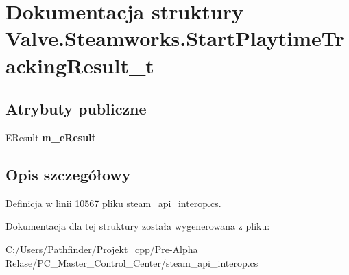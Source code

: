 \hypertarget{struct_valve_1_1_steamworks_1_1_start_playtime_tracking_result__t}{}\section{Dokumentacja struktury Valve.\+Steamworks.\+Start\+Playtime\+Tracking\+Result\+\_\+t}
\label{struct_valve_1_1_steamworks_1_1_start_playtime_tracking_result__t}
\subsection*{Atrybuty publiczne}
\begin{DoxyCompactItemize}
\item 
\mbox{\label{struct_valve_1_1_steamworks_1_1_start_playtime_tracking_result__t_a29d0b34b3eabd37302700a7db54c4584}} 
E\+Result {\bfseries m\+\_\+e\+Result}
\end{DoxyCompactItemize}


\subsection{Opis szczegółowy}


Definicja w linii 10567 pliku steam\+\_\+api\+\_\+interop.\+cs.



Dokumentacja dla tej struktury została wygenerowana z pliku\+:\begin{DoxyCompactItemize}
\item 
C\+:/\+Users/\+Pathfinder/\+Projekt\+\_\+cpp/\+Pre-\/\+Alpha Relase/\+P\+C\+\_\+\+Master\+\_\+\+Control\+\_\+\+Center/steam\+\_\+api\+\_\+interop.\+cs\end{DoxyCompactItemize}
